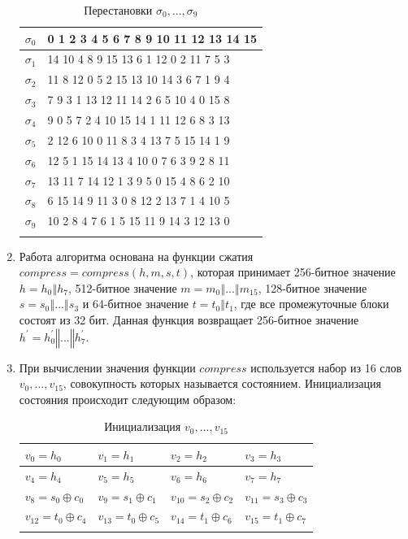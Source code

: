 \documentclass{./civarticle}
\begin{document}
\begin{enumerate}
\begin{longtable}{|p{0.5cm} | p{4.5cm}|}
\hline
$\sigma_0$ & 0 1 2 3 4 5 6 7 8 9 10 11 12 13 14 15 \\
\hline
$\sigma_1$ & 14 10 4 8 9 15 13 6 1 12 0 2 11 7 5 3 \\
\hline
$\sigma_2$ & 11 8 12 0 5 2 15 13 10 14 3 6 7 1 9 4  \\
\hline
$\sigma_3$ & 7 9 3 1 13 12 11 14 2 6 5 10 4 0 15 8 \\
\hline
$\sigma_4$ & 9 0 5 7 2 4 10 15 14 1 11 12 6 8 3 13 \\
\hline
$\sigma_5$ & 2 12 6 10 0 11 8 3 4 13 7 5 15 14 1 9 \\
\hline
$\sigma_6$ & 12 5 1 15 14 13 4 10 0 7 6 3 9 2 8 11 \\
\hline
$\sigma_7$ & 13 11 7 14 12 1 3 9 5 0 15 4 8 6 2 10 \\
\hline
$\sigma_8$ & 6 15 14 9 11 3 0 8 12 2 13 7 1 4 10 5 \\
\hline
$\sigma_9$ & 10 2 8 4 7 6 1 5 15 11 9 14 3 12 13 0 \\
\hline
\caption{Перестановки $\sigma_0, ..., \sigma_{9}$}
\end{longtable}

    \item Работа алгоритма основана на функции сжатия $compress = compress(h, m, s, t)$, которая принимает 256-битное значение $h = h_0 \mathbin\Vert h_7$, 512-битное значение $m = m_0 \mathbin\Vert ... \mathbin\Vert m_{15}$, 128-битное значение $s = s_0 \mathbin\Vert ... \mathbin\Vert s_3$ и 64-битное значение $t = t_0 \mathbin\Vert t_1$, где все промежуточные блоки состоят из 32 бит. Данная функция возвращает 256-битное значение $h^{'} = h_0^{'} \mathbin\Vert ... \mathbin\Vert h_7^{'}$.

    \item При вычислении значения функции $compress$ используется набор из 16 слов $v_0, ..., v_{15}$, совокупность которых называется состоянием. Инициализация состояния происходит следующим образом:

    \begin{longtable}{|p{2.6cm}|p{2.6cm}|p{2.6cm}|p{2.6cm}|}
\hline
$v_0 = h_0$ & $v_1 = h_1$ & $v_2 = h_2$ & $v_3 = h_3$ \\
\hline
$v_4 = h_4$ & $v_5 = h_5$ & $v_6 = h_6$ & $v_7 = h_7$ \\
\hline
$v_8 = s_0 \oplus c_0$ & $v_9 = s_1 \oplus c_1$ & $v_{10} = s_2 \oplus c_2$ & $v_{11} = s_3 \oplus c_3$ \\
\hline
$v_{12} = t_0 \oplus c_4$ & $v_{13} = t_0 \oplus c_5$ & $v_{14} = t_1 \oplus c_6$ & $v_{15} = t_1 \oplus c_7$ \\
\hline
\caption{Инициализация $v_0, ..., v_{15}$}
\end{longtable}


\end{enumerate}
\end{document}

